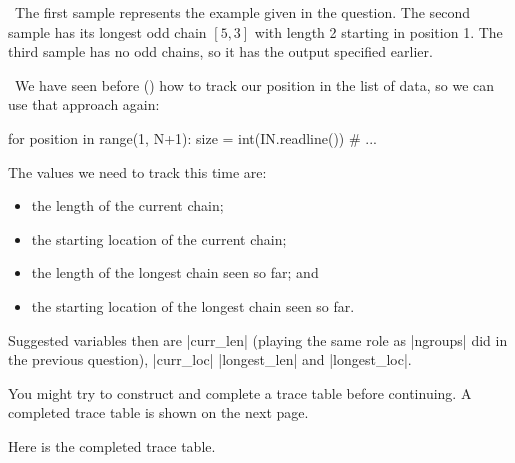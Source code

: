 \Explanation\ The first sample represents the example given in the question. The second
sample has its longest odd chain $[5,3]$ with length 2 starting in position 1. The third
sample has no odd chains, so it has the output specified earlier.

\Scratch\ We have seen before () how to track our
position in the list of data, so we can use that approach again:
\begin{pythoncode}
  for position in range(1, N+1):
    size = int(IN.readline())
    # ...
\end{pythoncode}

The values we need to track this time are:
\begin{itemize}
  \item the length of the current chain;
  \item the starting location of the current chain;
  \item the length of the longest chain seen so far; and
  \item the starting location of the longest chain seen so far.
\end{itemize}

Suggested variables then are \pycode|curr_len| (playing the same role as \pycode|ngroups|
did in the previous question), \pycode|curr_loc| \pycode|longest_len| and
\pycode|longest_loc|.

You might try to construct and complete a trace table before continuing. A completed trace
table is shown on the next page.


\clearpage %

Here is the completed trace table.

